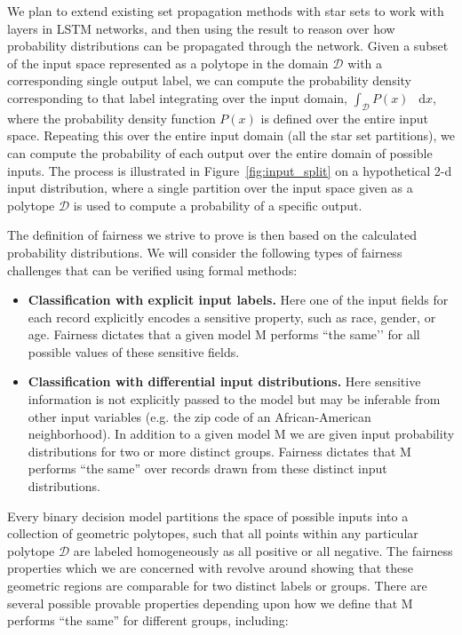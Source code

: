 \documentclass[11pt]{article}
\newcommand*\diff{\mathop{}\!\mathrm{d}}
\begin{document}
We plan to extend existing set propagation methods with star sets to work with layers in LSTM networks, and then using the result to reason over how probability distributions can be propagated through the network.
%
%
Given a subset of the input space represented as a polytope in the domain $\mathcal{D}$ with a corresponding single output label, we can compute the probability density corresponding to that label integrating over the input domain, $\int_\mathcal{D} P(x) ~ \diff x$, where the probability density function $P(x)$ is defined over the entire input space.
%
Repeating this over the entire input domain (all the star set partitions), we can compute the probability of each output over the entire domain of possible inputs.
%
The process is illustrated in Figure~\ref{fig:input_split} on a hypothetical 2-d input distribution, where a single partition over the input space given as a polytope $\mathcal{D}$ is used to compute a probability of a specific output.

The definition of fairness we strive to prove is then based on the calculated probability distributions.
%
We will consider the following types of fairness challenges that can be verified using formal methods:

\begin{itemize}
\item \textbf{Classification with explicit input labels.} Here one of the input fields for each record explicitly encodes a sensitive property, such as race, gender, or age.   Fairness dictates that a given model M performs “the same’’ for all possible values of these sensitive fields.
%
\item \textbf{Classification with differential input distributions.} Here sensitive information is not explicitly passed to the model but may be inferable from other input variables (e.g. the zip code of an African-American neighborhood).   In addition to a given model M we are given input probability distributions for two or more distinct groups.   Fairness dictates that M performs “the same” over records drawn from these distinct input distributions.
\end{itemize}

Every binary decision model partitions the space of possible inputs into a collection of geometric polytopes, such that all points within any particular polytope $\mathcal{D}$ are labeled homogeneously as all positive or all negative. 
%
The fairness properties which we are concerned with revolve around showing that these geometric regions are comparable for two distinct labels or groups. There are several possible provable properties depending upon how we define that M performs “the same” for different groups, including:  
\end{document}
